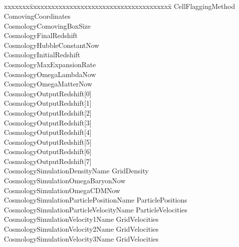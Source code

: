 \documentclass{book}
\begin{document}
\subsection{\enzo}

{\parametersize
\begin{tabbing}
xxxxxxx\=xxxxxxxxxxxxxxxxxxxxxxxxxxxxxxxxxxxxxxx\=\kill
\> CellFlaggingMethod             \\
\> ComovingCoordinates                \\
\> CosmologyComovingBoxSize        \\
\> CosmologyFinalRedshift             \\
\> CosmologyHubbleConstantNow       \\
\> CosmologyInitialRedshift          \\
\> CosmologyMaxExpansionRate      \\
\> CosmologyOmegaLambdaNow     \\
\> CosmologyOmegaMatterNow     \\
\> CosmologyOutputRedshift[0]  \\
\> CosmologyOutputRedshift[1]  \\
\> CosmologyOutputRedshift[2]  \\
\> CosmologyOutputRedshift[3]  \\
\> CosmologyOutputRedshift[4]  \\
\> CosmologyOutputRedshift[5]  \\
\> CosmologyOutputRedshift[6]  \\
\> CosmologyOutputRedshift[7]  \\
\> CosmologySimulationDensityName          \> GridDensity \\
\> CosmologySimulationOmegaBaryonNow        \\
\> CosmologySimulationOmegaCDMNow           \\
\> CosmologySimulationParticlePositionName \> ParticlePositions \\
\> CosmologySimulationParticleVelocityName \> ParticleVelocities \\
\> CosmologySimulationVelocity1Name        \> GridVelocities \\
\> CosmologySimulationVelocity2Name        \> GridVelocities \\
\> CosmologySimulationVelocity3Name        \> GridVelocities \\

\end{tabbing}}
\end{document}
